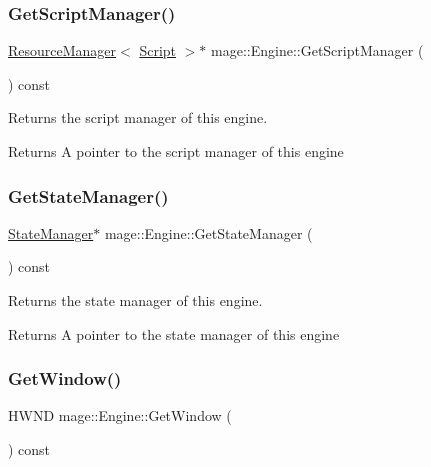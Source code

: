 \subsubsection{\texorpdfstring{Get\+Script\+Manager()}{GetScriptManager()}}
{\footnotesize\ttfamily \hyperlink{classmage_1_1_resource_manager}{Resource\+Manager}$<$ \hyperlink{classmage_1_1_script}{Script} $>$$\ast$ mage\+::\+Engine\+::\+Get\+Script\+Manager (\begin{DoxyParamCaption}{ }\end{DoxyParamCaption}) const}

Returns the script manager of this engine.

\begin{DoxyReturn}{Returns}
A pointer to the script manager of this engine 
\end{DoxyReturn}
\hypertarget{classmage_1_1_engine_a4f35bccc3784de531245a2549d537745}{}\label{classmage_1_1_engine_a4f35bccc3784de531245a2549d537745} 
\subsubsection{\texorpdfstring{Get\+State\+Manager()}{GetStateManager()}}
{\footnotesize\ttfamily \hyperlink{classmage_1_1_state_manager}{State\+Manager}$\ast$ mage\+::\+Engine\+::\+Get\+State\+Manager (\begin{DoxyParamCaption}{ }\end{DoxyParamCaption}) const}

Returns the state manager of this engine.

\begin{DoxyReturn}{Returns}
A pointer to the state manager of this engine 
\end{DoxyReturn}
\hypertarget{classmage_1_1_engine_a1c5f9d8c68045b36f404251359aa41e4}{}\label{classmage_1_1_engine_a1c5f9d8c68045b36f404251359aa41e4} 
\subsubsection{\texorpdfstring{Get\+Window()}{GetWindow()}}
{\footnotesize\ttfamily H\+W\+ND mage\+::\+Engine\+::\+Get\+Window (\begin{DoxyParamCaption}{ }\end{DoxyParamCaption}) const}

